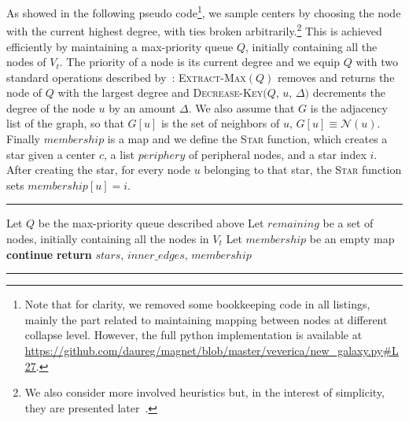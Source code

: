 As showed in the following pseudo code\footnote{Note that for
clarity, we removed some bookkeeping code in all listings, mainly the part related to maintaining
mapping between nodes at different collapse level. However, the full python implementation
is available at \url{https://github.com/daureg/magnet/blob/master/veverica/new_galaxy.py\#L27}.}, we
sample centers by choosing the node with the current highest degree, with ties broken
arbitrarily.\footnote{We also consider more involved heuristics but, in the interest of simplicity,
they are presented later~.} This is achieved efficiently by
maintaining a max-priority queue $Q$, initially containing all the nodes of $V_t$. The priority of a
node is its current degree and we equip $Q$ with two standard operations described
by~\textcite[section 6.5]{CormenAlgo09}: \textsc{Extract-Max}$(Q)$ removes and returns the
node of $Q$ with the largest degree and \textsc{Decrease-Key}$(Q$, $u$, $\Delta)$ decrements
the degree of the node $u$ by an amount $\Delta$.
We also assume that $G$ is the adjacency list of the graph, so that $G[u]$ is the set of neighbors of
$u$, \ie{} $G[u] \equiv \mathcal{N}(u)$. Finally $membership$ is a map and we
define the \textsc{Star} function, which creates a star given a center $c$, a list $periphery$ of
peripheral nodes, and a star index $i$. After creating the \ith{} star, for every node $u$ belonging
to that star, the \textsc{Star} function sets $membership[u] = i$.
\vspace{-\baselineskip}

\begin{center}
  \rule{\textwidth}{.3pt}
  \begin{algorithmic}[1]
      \State Let $Q$ be the max-priority queue described above
      \State Let $remaining$ be a set of nodes, initially containing all the nodes in $V_t$
      \State Let $membership$ be an empty map
          \State \textbf{continue} 
        \EndIf
            \State {}
          \EndFor
        \EndFor
      \EndWhile
      \State \textbf{return} $stars$, $inner\_edges$, $membership$
    \EndFunction
  \end{algorithmic}
  \rule{\textwidth}{.3pt}
\end{center}

